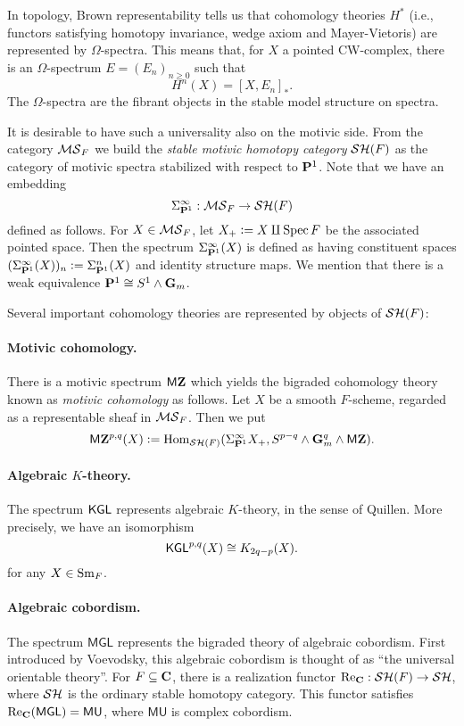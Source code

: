In topology, Brown representability tells us that cohomology theories $H^*$ (i.e., functors satisfying homotopy invariance, wedge axiom and Mayer-Vietoris) are represented by $\Omega$-spectra. This means that, for $X$ a pointed CW-complex,  there is an $\Omega$-spectrum $E=(E_n)_{n\ge0}$ such that
\[
H^n(X)=[X,E_n]_*.
\]The $\Omega$-spectra are the fibrant objects in the stable model structure on spectra.

It is desirable to have such a universality also on the motivic side. From the category $\mathcal{MS}_F$ we build the \emph{stable motivic homotopy category} $\mathcal{SH}(F)$ as the category of motivic spectra stabilized with respect to $\mathbf{P}^1$. Note that we have an embedding
\[\Sigma_{\mathbf{P}^1}^\infty:\mathcal{MS}_F\rightarrow\mathcal{SH}(F)
\]defined as follows. For $X\in \mathcal{MS}_F$, let $X_+\vcentcolon= X\amalg\operatorname{Spec} F$ be the associated pointed space. Then the spectrum $\Sigma^\infty_{\mathbf{P}^1}(X)$ is defined as having constituent spaces $(\Sigma^\infty_{\mathbf{P}^1}(X))_n\vcentcolon= \Sigma^n_{\mathbf{P}^1}(X)$ and identity structure maps. We mention that there is a weak equivalence $\mathbf{P}^1\cong S^1\wedge\mathbf{G}_m$.

Several important cohomology theories are represented by objects of $\mathcal{SH}(F)$:
\paragraph{Motivic cohomology.}There is a motivic spectrum $\mathsf M\mathbf{Z}$ which yields the bigraded cohomology theory known as \emph{motivic cohomology} as follows. Let $X$ be a smooth $F$-scheme, regarded as a representable sheaf in $\mathcal{MS}_F$. Then we put
\[
\mathsf M\mathbf{Z}^{p,q}(X)\vcentcolon=\operatorname{Hom}_{\mathcal{SH}(F)}(\Sigma^\infty_{\mathbf{P}^1}X_+,S^{p-q}\wedge\mathbf{G}_m^q\wedge \mathsf M\mathbf{Z}).
\]

\paragraph{Algebraic $K$-theory.}The spectrum $\mathsf{KGL}$ represents algebraic $K$-theory, in the sense of Quillen. More precisely, we have an isomorphism
\[
\mathsf{KGL}^{p,q}(X)\cong K_{2q-p}(X).
\]for any $X\in\mathrm{Sm}_F$.
\paragraph{Algebraic cobordism.}The spectrum $\mathsf{MGL}$ represents the bigraded theory of algebraic cobordism. First introduced by Voevodsky, this algebraic cobordism is thought of as ``the universal orientable theory''. For $F\subseteq\mathbf{C}$, there is a realization functor $\mathrm{Re}_{\mathbf{C}}:\mathcal{SH}(F)\to\mathcal{SH}$, where $\mathcal{SH}$ is the ordinary stable homotopy category. This functor satisfies $\mathrm{Re}_{\mathbf{C}}(\mathsf{MGL})=\mathsf{MU }$, where $\mathsf{MU}$ is complex cobordism.

